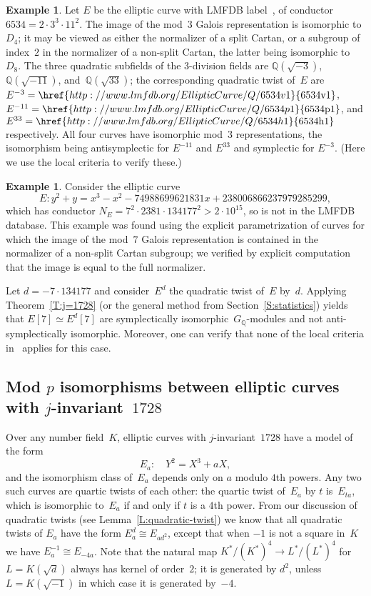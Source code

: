 \documentclass[12pt]{amsart}
\newcommand{\lmfdbec}[3]{\href{http://www.lmfdb.org/EllipticCurve/Q/#1#2#3}{{\text{\rm#1#2#3}}}}
\newcommand{\Q}{\mathbb{Q}}
\numberwithin{equation}{section}
\theoremstyle{definition}
\newtheorem{example}[theorem]{Example}
\theoremstyle{remark}
\begin{document}
\begin{example} \label{Ex:3twists}
  Let $E$ be the elliptic curve with LMFDB label~\lmfdbec{6534}{a}{1},
  of conductor $6534=2\cdot3^3\cdot11^2$.  The image of the mod~$3$
  Galois representation is isomorphic to $D_4$; it may be viewed as
  either the normalizer of a split Cartan, or a subgroup of index~$2$
  in the normalizer of a non-split Cartan, the latter being isomorphic
  to~$D_8$.  The three quadratic subfields of the $3$-division fields
  are $\Q(\sqrt{-3})$, $\Q(\sqrt{-11})$, and~$\Q(\sqrt{33})$; the
  corresponding quadratic twist of~$E$ are
  $E^{-3}=\lmfdbec{6534}{v}{1}$, $E^{-11}=\lmfdbec{6534}{p}{1}$, and
  $E^{33}=\lmfdbec{6534}{h}{1}$ respectively.  All four curves have
  isomorphic mod~$3$ representations, the isomorphism being
  antisymplectic for $E^{-11}$ and $E^{33}$ and symplectic for
  $E^{-3}$. (Here we use the local criteria to verify these.)
\end{example}
\begin{example} \label{Ex:LocalFail7}
Consider the elliptic curve
\[ E : y^2 + y = x^3 - x^2 - 74988699621831x +  238006866237979285299, \]
which has conductor $ N_E = 7^2 \cdot 2381 \cdot
134177^2>2\cdot10^{15}$, so is not in the LMFDB database.  This
example was found using the explicit parametrization of curves for
which the image of the mod~$7$ Galois representation is contained in
the normalizer of a non-split Cartan subgroup; we verified by explicit
computation that the image is equal to the full normalizer.

Let $d = -7 \cdot 134177$ and consider~$E^d$ the quadratic twist
of~$E$ by~$d$. Applying Theorem~\ref{T:j=1728} (or the general method
from Section~\ref{S:statistics}) yields that $E[7] \simeq E^d[7]$ are
symplectically isomorphic~$G_\Q$-modules and not anti-symplectically
isomorphic. Moreover, one can verify that none of the local criteria
in~\cite{FKSym} applies for this case.
\end{example}


\subsection{Mod $p$ isomorphisms between elliptic curves with
  $j$-invariant~$1728$}

Over any number field~$K$, elliptic curves with $j$-invariant~$1728$
have a model of the form
\[
E_a:\quad Y^2 = X^3+aX,
\]
and the isomorphism class of~$E_a$ depends only on
$a$ modulo $4$th powers. 
Any two such curves are quartic
twists of each other: the quartic twist of~$E_a$ by $t$ 
is~$E_{ta}$, which is isomorphic to~$E_a$ if and only if $t$ is a $4$th power. 
From our discussion of quadratic twists (see
Lemma~\ref{L:quadratic-twist}) we know that all quadratic twists of
$E_a$ have the form $E_a^d\cong E_{ad^2}$, except that when $-1$ is
not a square in~$K$ we have $E_a^{-1}\cong E_{-4a}$.  Note that the
natural map $K^*/(K^*)^4 \to L^*/(L^*)^4$ for $L=K(\sqrt{d})$ always
has kernel of order~$2$; it is generated by $d^2$, unless
$L=K(\sqrt{-1})$ in which case it is generated by~$-4$.
\end{document}
